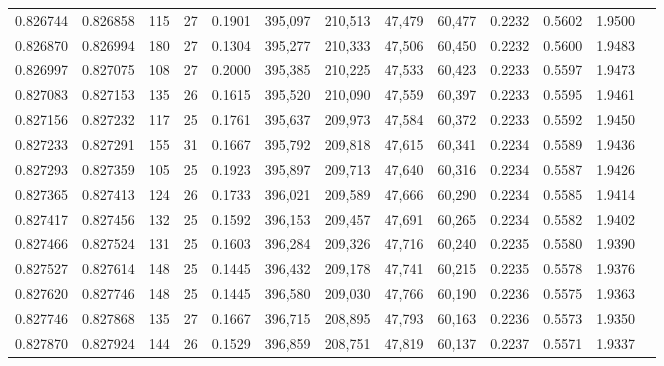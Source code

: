 \begin{tabular}{rrrrrrrrrrrrr}
0.826744 & 0.826858 &   115 &  27 &                                     0.1901 & 395,097 & 210,513 &  47,479 &  60,477 & 0.2232 & 0.5602 & 1.9500 \\
0.826870 & 0.826994 &   180 &  27 &                                     0.1304 & 395,277 & 210,333 &  47,506 &  60,450 & 0.2232 & 0.5600 & 1.9483 \\
0.826997 & 0.827075 &   108 &  27 &                                     0.2000 & 395,385 & 210,225 &  47,533 &  60,423 & 0.2233 & 0.5597 & 1.9473 \\
0.827083 & 0.827153 &   135 &  26 &                                     0.1615 & 395,520 & 210,090 &  47,559 &  60,397 & 0.2233 & 0.5595 & 1.9461 \\
0.827156 & 0.827232 &   117 &  25 &                                     0.1761 & 395,637 & 209,973 &  47,584 &  60,372 & 0.2233 & 0.5592 & 1.9450 \\
0.827233 & 0.827291 &   155 &  31 &                                     0.1667 & 395,792 & 209,818 &  47,615 &  60,341 & 0.2234 & 0.5589 & 1.9436 \\
0.827293 & 0.827359 &   105 &  25 &                                     0.1923 & 395,897 & 209,713 &  47,640 &  60,316 & 0.2234 & 0.5587 & 1.9426 \\
0.827365 & 0.827413 &   124 &  26 &                                     0.1733 & 396,021 & 209,589 &  47,666 &  60,290 & 0.2234 & 0.5585 & 1.9414 \\
0.827417 & 0.827456 &   132 &  25 &                                     0.1592 & 396,153 & 209,457 &  47,691 &  60,265 & 0.2234 & 0.5582 & 1.9402 \\
0.827466 & 0.827524 &   131 &  25 &                                     0.1603 & 396,284 & 209,326 &  47,716 &  60,240 & 0.2235 & 0.5580 & 1.9390 \\
0.827527 & 0.827614 &   148 &  25 &                                     0.1445 & 396,432 & 209,178 &  47,741 &  60,215 & 0.2235 & 0.5578 & 1.9376 \\
0.827620 & 0.827746 &   148 &  25 &                                     0.1445 & 396,580 & 209,030 &  47,766 &  60,190 & 0.2236 & 0.5575 & 1.9363 \\
0.827746 & 0.827868 &   135 &  27 &                                     0.1667 & 396,715 & 208,895 &  47,793 &  60,163 & 0.2236 & 0.5573 & 1.9350 \\
0.827870 & 0.827924 &   144 &  26 &                                     0.1529 & 396,859 & 208,751 &  47,819 &  60,137 & 0.2237 & 0.5571 & 1.9337 \\

\end{tabular}
